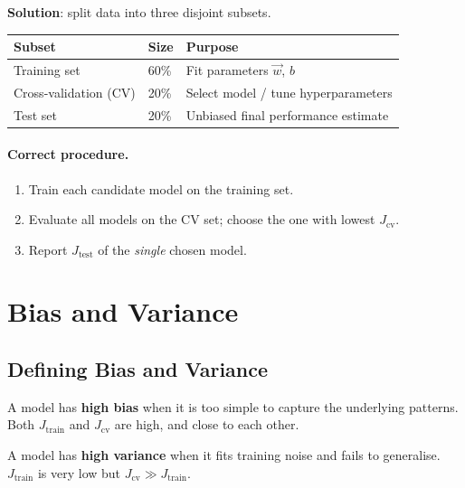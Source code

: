 \textbf{Solution}: split data into three disjoint subsets.

\begin{center}
\begin{tabular}{lll}
\toprule
\textbf{Subset} & \textbf{Size} & \textbf{Purpose}\\
\midrule
Training set         & 60\% & Fit parameters $\vec{w}$, $b$\\
Cross-validation (CV) & 20\% & Select model / tune hyperparameters\\
Test set             & 20\% & Unbiased final performance estimate\\
\bottomrule
\end{tabular}
\end{center}

\paragraph{Correct procedure.}
\begin{enumerate}
\item Train each candidate model on the training set.
\item Evaluate all models on the CV set; choose the one with lowest $J_{\text{cv}}$.
\item Report $J_{\text{test}}$ of the \emph{single} chosen model.
\end{enumerate}

\section{Bias and Variance}

\subsection{Defining Bias and Variance}

\begin{definition}
A model has \textbf{high bias} when it is too simple to capture the underlying
patterns. Both $J_{\text{train}}$ and $J_{\text{cv}}$ are high, and close
to each other.
\end{definition}

\begin{definition}
A model has \textbf{high variance} when it fits training noise and fails to
generalise. $J_{\text{train}}$ is very low but
$J_{\text{cv}}\gg J_{\text{train}}$.
\end{definition}

